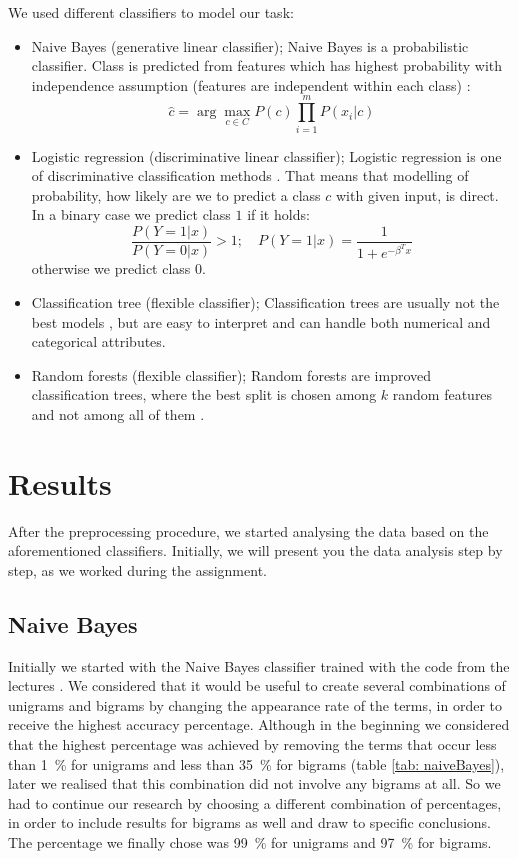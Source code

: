 \documentclass[a4paper,11pt]{article}
\begin{document}
We used different classifiers to model our task:
\begin{itemize}
	\item Naive Bayes (generative linear classifier); Naive Bayes is a probabilistic classifier. Class is predicted from features which has highest probability with independence assumption (features are independent within each class) \cite{naiveBayes}:
\[
\hat{c} = \arg\max_{c \in C} P(c) \prod_{i = 1}^m P(x_i | c)
\] 
	\item Logistic regression (discriminative linear classifier); Logistic regression is one of discriminative classification methods \cite{logisticRegression}. That means that modelling of probability, how likely are we to predict a class $c$ with given input, is direct. In a binary case we predict class $1$ if it holds:
\[
\frac{P(Y = 1 | x)}{P(Y = 0 | x)} > 1; \quad P (Y = 1 | x) = \frac{1}{1 + e^{-\beta^T x}}
\]
otherwise we predict class $0$.
	\item Classification tree (flexible classifier); Classification trees are usually not the best models \cite{classificationTrees}, but are easy to interpret and can handle both numerical and categorical attributes. 
	\item Random forests (flexible classifier); Random forests are improved classification trees, where the best split is chosen among $k$ random features and not among all of them \cite{randomForestsL}. 
\end{itemize}

\section{Results}
\label{sec: results}

After the preprocessing procedure, we started analysing the data based on the aforementioned classifiers. Initially, we will present you the data analysis step by step, as we worked during the assignment.

\subsection{Naive Bayes}
\label{subsec: naiveBayes}

Initially we started with the Naive Bayes classifier trained with the code from the lectures \cite{code}. We considered that it would be useful to create several combinations of unigrams and bigrams by changing the appearance rate of the terms, in order to receive the highest accuracy percentage. Although in the beginning we considered that the highest percentage was achieved by removing the terms that occur less than 1~\% for unigrams and less than 35~\% for bigrams (table \ref{tab: naiveBayes}), later we realised that this combination did not involve any bigrams at all. So we had to continue our research by choosing a different combination of percentages, in order to include results for bigrams as well and draw to specific conclusions. The percentage we finally chose was 99~\% for unigrams and 97~\% for bigrams.
\end{document}
